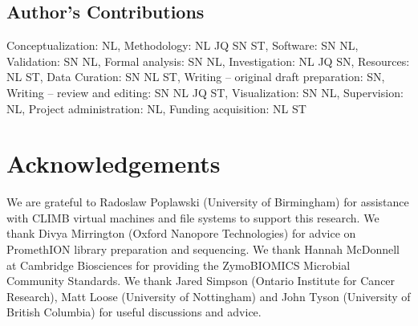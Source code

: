 \documentclass[a4paper,num-refs]{oup-contemporary}
\begin{document}
\subsection{Author's Contributions}
Conceptualization: NL, Methodology: NL JQ SN ST, Software: SN NL, Validation: SN NL, Formal analysis: SN NL, Investigation: NL JQ SN, Resources: NL ST, Data Curation: SN NL ST, Writing – original draft preparation: SN, Writing – review and editing: SN NL JQ ST, Visualization: SN NL, Supervision: NL, Project administration: NL, Funding acquisition: NL ST



\section{Acknowledgements}

We are grateful to Radoslaw Poplawski (University of Birmingham) for assistance with CLIMB virtual machines and file systems to support this research. We thank Divya Mirrington (Oxford Nanopore Technologies) for advice on PromethION library preparation and sequencing. We thank Hannah McDonnell at Cambridge Biosciences for providing the ZymoBIOMICS Microbial Community Standards. We thank Jared Simpson (Ontario Institute for Cancer Research), Matt Loose (University of Nottingham) and John Tyson (University of British Columbia) for useful discussions and advice.





\end{document}
